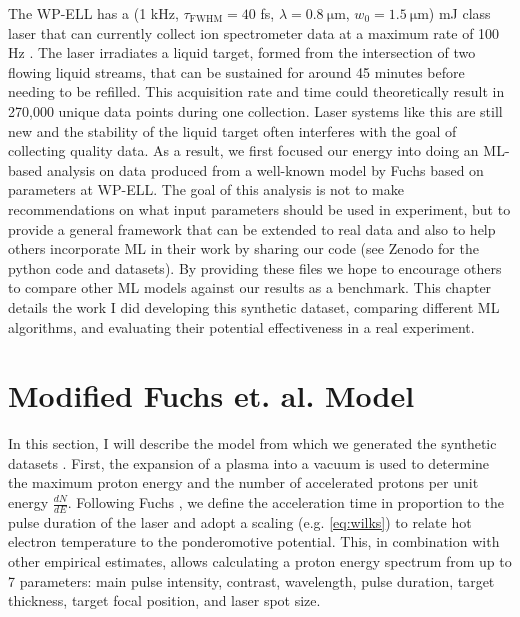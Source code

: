The \gls{WP-ELL} has a (1 kHz, $\tau_\text{FWHM} = 40$ fs, $\lambda = \SI{0.8}{\micro \meter}$, $w_0 = \SI{1.5}{\micro \meter}$) mJ class laser that can currently collect ion spectrometer data at a maximum rate of 100 Hz \cite{George_2019_HPLSE}. The laser irradiates a liquid target, formed from the intersection of two flowing liquid streams, that can be sustained for around 45 minutes before needing to be refilled. This acquisition rate and time could theoretically result in 270,000 unique data points during one collection. Laser systems like this are still new and the stability of the liquid target often interferes with the goal of collecting quality data. As a result, we first focused our energy into doing an \gls{ML}-based analysis on data produced from a well-known model by Fuchs \cite{Fuchs_2005_Nat} based on parameters at \gls{WP-ELL}. The goal of this analysis is not to make recommendations on what input parameters should be used in experiment, but to provide a general framework that can be extended to real data and also to help others incorporate \gls{ML} in their work by sharing our code (see Zenodo \cite{Desai_2024_Zenodo, Desai_2025_Zenodo} for the python code and datasets). By providing these files we hope to encourage others to compare other ML models against our results as a benchmark. This chapter details the work I did developing this synthetic dataset, comparing different \gls{ML} algorithms, and evaluating their potential effectiveness in a real experiment. 

\section{Modified Fuchs et. al. Model} \label{sec:fuchs_model}

In this section, I will describe the model from which we generated the synthetic datasets \cite{Desai_2024_CPP, Desai_2025_APL}. First, the expansion of a plasma into a vacuum \cite{Mora_2003_PRL} is used to determine the maximum proton energy and the number of accelerated protons per unit energy $\frac{dN}{dE}$. Following Fuchs \cite{Fuchs_2005_Nat}, we define the acceleration time in proportion to the pulse duration of the laser and adopt a scaling (e.g. \autoref{eq:wilks}) to relate hot electron temperature to the ponderomotive potential. This, in combination with other empirical estimates, allows calculating a proton energy spectrum from up to 7 parameters: main pulse intensity, contrast, wavelength, pulse duration, target thickness, target focal position, and laser spot size.

